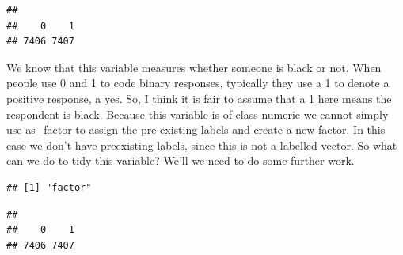 \documentclass[
]{book}
\newenvironment{Shaded}{\begin{snugshade}}{\end{snugshade}}
\newcommand{\CommentTok}[1]{\textcolor[rgb]{0.56,0.35,0.01}{\textit{#1}}}
\newcommand{\FunctionTok}[1]{\textcolor[rgb]{0.00,0.00,0.00}{#1}}
\newcommand{\NormalTok}[1]{#1}
\newcommand{\OtherTok}[1]{\textcolor[rgb]{0.56,0.35,0.01}{#1}}
\newcommand{\SpecialCharTok}[1]{\textcolor[rgb]{0.00,0.00,0.00}{#1}}
\begin{document}
\begin{Shaded}
\end{Shaded}

\begin{verbatim}
## 
##    0    1 
## 7406 7407
\end{verbatim}

We know that this variable measures whether someone is black or not. When people use 0 and 1 to code binary responses, typically they use a 1 to denote a positive response, a yes. So, I think it is fair to assume that a 1 here means the respondent is black. Because this variable is of class numeric we cannot simply use as\_factor to assign the pre-existing labels and create a new factor. In this case we don't have preexisting labels, since this is not a labelled vector. So what can we do to tidy this variable? We'll we need to do some further work.

\begin{Shaded}
\end{Shaded}

\begin{verbatim}
## [1] "factor"
\end{verbatim}

\begin{Shaded}
\end{Shaded}

\begin{verbatim}
## 
##    0    1 
## 7406 7407
\end{verbatim}
\end{document}
